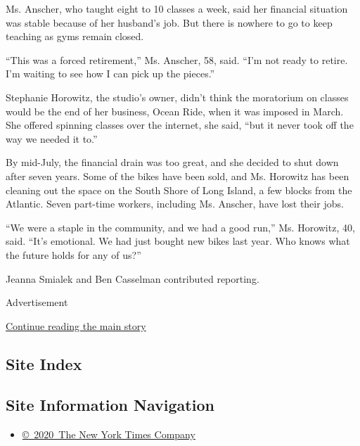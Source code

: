 Ms. Anscher, who taught eight to 10 classes a week, said her financial
situation was stable because of her husband's job. But there is nowhere
to go to keep teaching as gyms remain closed.

``This was a forced retirement,'' Ms. Anscher, 58, said. ``I'm not ready
to retire. I'm waiting to see how I can pick up the pieces.''

Stephanie Horowitz, the studio's owner, didn't think the moratorium on
classes would be the end of her business, Ocean Ride, when it was
imposed in March. She offered spinning classes over the internet, she
said, ``but it never took off the way we needed it to.''

By mid-July, the financial drain was too great, and she decided to shut
down after seven years. Some of the bikes have been sold, and Ms.
Horowitz has been cleaning out the space on the South Shore of Long
Island, a few blocks from the Atlantic. Seven part-time workers,
including Ms. Anscher, have lost their jobs.

``We were a staple in the community, and we had a good run,'' Ms.
Horowitz, 40, said. ``It's emotional. We had just bought new bikes last
year. Who knows what the future holds for any of us?''

Jeanna Smialek and Ben Casselman contributed reporting.

Advertisement

\protect\hyperlink{after-bottom}{Continue reading the main story}

\hypertarget{site-index}{%
\subsection{Site Index}\label{site-index}}

\hypertarget{site-information-navigation}{%
\subsection{Site Information
Navigation}\label{site-information-navigation}}

\begin{itemize}
\tightlist
\item
  \href{https://help.nytimes3xbfgragh.onion/hc/en-us/articles/115014792127-Copyright-notice}{©~2020~The
  New York Times Company}
\end{itemize}

